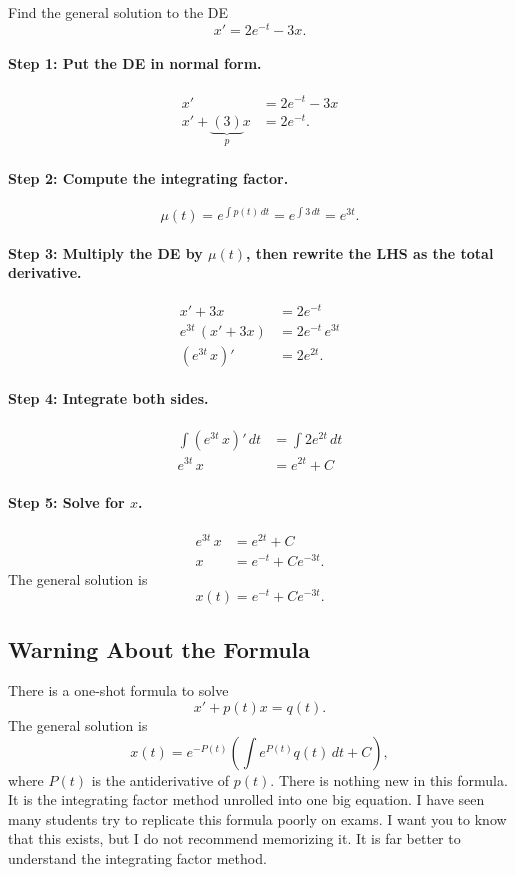 \documentclass[09pt,letterpaper]{article}
\begin{document}
\begin{example}[3]{
Find the general solution to the DE
\[
x' = 2e^{-t} - 3x.
\]
}
\paragraph{Step 1: Put the DE in normal form.}
\begin{align*}
x' &= 2e^{-t} - 3x\\
x' + \underbrace{(3)}_{p}x &= 2e^{-t}.
\end{align*}
\paragraph{Step 2: Compute the integrating factor.} 
\[
\mu(t)=e^{\int p(t)\,dt}=e^{\int 3\,dt}=e^{3t}.
\]

\paragraph{Step 3: Multiply the DE by $\mu(t)$, then rewrite the LHS as the total derivative.} 
\begin{align*}
    x' + 3x &= 2e^{-t}\\
    e^{3t}\,(x' + 3x) &= 2e^{-t}\,e^{3t}\\
(e^{3t}\,x)' &= 2e^{2t}.
\end{align*}

\paragraph{Step 4: Integrate both sides.}
\begin{align*}
\int (e^{3t}\,x)'\,dt &= \int 2e^{2t}\,dt\\
e^{3t}\,x &= e^{2t}+C
\end{align*}

\paragraph{Step 5: Solve for $x$.}
\begin{align*}    
e^{3t}\,x &= e^{2t}+C\\
x&=e^{-t}+Ce^{-3t}.
\end{align*}
The general solution is 
$$
\boxed{x(t)=e^{-t}+Ce^{-3t}.}
$$
\end{example}

\subsection{Warning About the Formula}
There is a one-shot formula to solve 
$$
    x' + p(t) x=q(t).
$$
The general solution is 
$$
    x(t) = e^{-P(t)}\left( \int e^{P(t)} q(t)\,dt+C\right),
$$
where $P(t)$ is the antiderivative of $p(t)$. There is nothing new in this formula. It is the integrating factor method unrolled into one big equation. I have seen many students try to replicate this formula poorly on exams. I want you to know that this exists, but I do not recommend memorizing it. It is far better to understand the integrating factor method.
\end{document}
